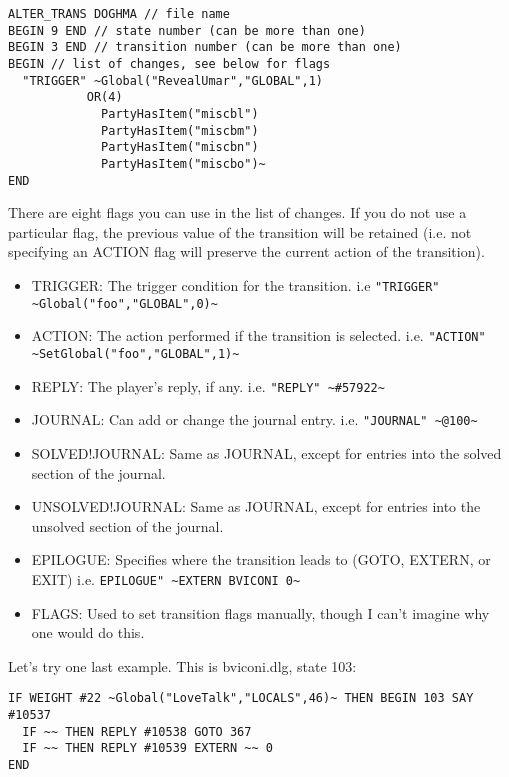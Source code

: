\documentclass{article}
\begin{document}
\begin{verbatim}
ALTER_TRANS DOGHMA // file name
BEGIN 9 END // state number (can be more than one)
BEGIN 3 END // transition number (can be more than one)
BEGIN // list of changes, see below for flags
  "TRIGGER" ~Global("RevealUmar","GLOBAL",1)
           OR(4)
             PartyHasItem("miscbl")
             PartyHasItem("miscbm")
             PartyHasItem("miscbn")
             PartyHasItem("miscbo")~
END
\end{verbatim}


There are eight flags you can use in the list of changes. If you do not use a particular flag, the previous value of the transition will be retained (i.e. not specifying an ACTION flag will preserve the current action of the transition).

\begin{itemize}
\item TRIGGER: The trigger condition for the transition.
 i.e \verb+"TRIGGER" ~Global("foo","GLOBAL",0)~+

\item ACTION: The action performed if the transition is selected.
  i.e. \verb+"ACTION" ~SetGlobal("foo","GLOBAL",1)~+

\item REPLY: The player's reply, if any.
  i.e. \verb+"REPLY" ~#57922~+

\item JOURNAL: Can add or change the journal entry.
  i.e. \verb+"JOURNAL" ~@100~+

\item SOLVED!JOURNAL: Same as JOURNAL, except for entries into the solved section of the journal.

\item UNSOLVED!JOURNAL: Same as JOURNAL, except for entries into the unsolved section of the journal.

\item EPILOGUE: Specifies where the transition leads to (GOTO, EXTERN, or EXIT)
  i.e. \verb+EPILOGUE" ~EXTERN BVICONI 0~+

\item FLAGS: Used to set transition flags manually, though I can't imagine why one would do this.
\end{itemize}

Let's try one last example. This is bviconi.dlg, state 103:

\begin{verbatim}
IF WEIGHT #22 ~Global("LoveTalk","LOCALS",46)~ THEN BEGIN 103 SAY #10537
  IF ~~ THEN REPLY #10538 GOTO 367
  IF ~~ THEN REPLY #10539 EXTERN ~~ 0
END
\end{verbatim}
\end{document}
